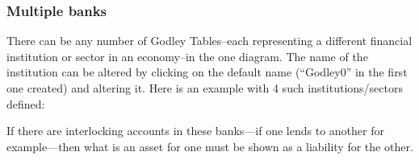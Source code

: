 \subsubsection{Multiple banks}

There can be any number of Godley Tables--each representing a
different financial institution or sector in an economy--in the one
diagram. The name of the institution can be altered by clicking on the
default name (``Godley0'' in the first one created) and altering
it. Here is an example with 4 such institutions/sectors defined:



If there are interlocking accounts in these banks---if one lends to
another for example---then what is an asset for one must be shown as a
liability for the other. 
